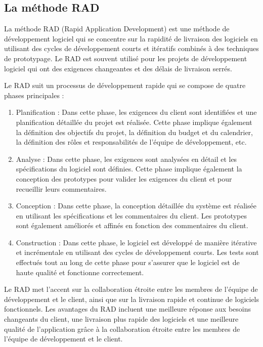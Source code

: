 \subsection{La méthode RAD}\label{subsec:methode-rad}
La méthode RAD (Rapid Application Development) est une méthode de développement logiciel qui se concentre sur la rapidité de livraison des logiciels en utilisant des cycles de développement courts et itératifs combinés à des techniques de prototypage. Le RAD est souvent utilisé pour les projets de développement logiciel qui ont des exigences changeantes et des délais de livraison serrés.

Le RAD suit un processus de développement rapide qui se compose de quatre phases principales :

\begin{enumerate}
    \item Planification : Dans cette phase, les exigences du client sont identifiées et une planification détaillée du projet est réalisée. Cette phase implique également la définition des objectifs du projet, la définition du budget et du calendrier, la définition des rôles et responsabilités de l'équipe de développement, etc.
    \item Analyse : Dans cette phase, les exigences sont analysées en détail et les spécifications du logiciel sont définies. Cette phase implique également la conception des prototypes pour valider les exigences du client et pour recueillir leurs commentaires.
    \item Conception : Dans cette phase, la conception détaillée du système est réalisée en utilisant les spécifications et les commentaires du client. Les prototypes sont également améliorés et affinés en fonction des commentaires du client.
    \item Construction : Dans cette phase, le logiciel est développé de manière itérative et incrémentale en utilisant des cycles de développement courts. Les tests sont effectués tout au long de cette phase pour s'assurer que le logiciel est de haute qualité et fonctionne correctement.
\end{enumerate}

Le RAD met l'accent sur la collaboration étroite entre les membres de l'équipe de développement et le client, ainsi que sur la livraison rapide et continue de logiciels fonctionnels. Les avantages du RAD incluent une meilleure réponse aux besoins changeants du client, une livraison plus rapide des logiciels et une meilleure qualité de l'application grâce à la collaboration étroite entre les membres de l'équipe de développement et le client.

